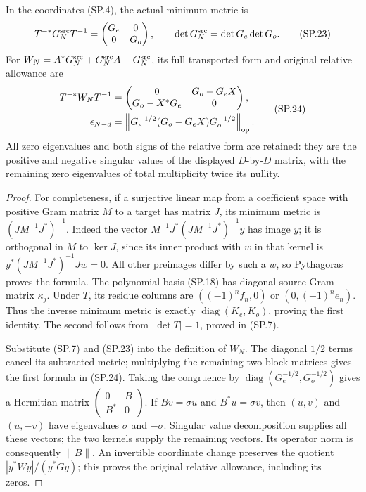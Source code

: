 \begin{theorem}
In the coordinates (SP.4), the actual minimum metric is
\[
 T^{-*}G_N^{\rm src}T^{-1}
       =\begin{pmatrix}G_e&0\\0&G_o\end{pmatrix},\qquad
 \det G_N^{\rm src}=\det G_e\det G_o.
 \tag{SP.23}
\]
For \(W_N=A^*G_N^{\rm src}+G_N^{\rm src}A-G_N^{\rm src}\),
its full transported form and original relative allowance are
\[
 \begin{aligned}
 T^{-*}W_NT^{-1}
   &=\begin{pmatrix}0&G_o-G_eX\\G_o-X^*G_e&0\end{pmatrix},\\
 \epsilon_{N-d}
   &=\left\|G_e^{-1/2}(G_o-G_eX)G_o^{-1/2}\right\|_{\rm op}.
 \end{aligned}
 \tag{SP.24}
\]
All zero eigenvalues and both signs of the relative form are
retained: they are the positive and negative singular values of
the displayed \(D\)-by-\(D\) matrix, with the remaining zero
eigenvalues of total multiplicity twice its nullity.
\end{theorem}

\begin{proof}
For completeness, if a surjective linear map from a coefficient
space with positive Gram matrix \(M\) to a target has matrix \(J\),
its minimum metric is \((JM^{-1}J^*)^{-1}\). Indeed the vector
\(M^{-1}J^*(JM^{-1}J^*)^{-1}y\) has image \(y\); it is orthogonal
in \(M\) to \(\ker J\), since its inner product with \(w\) in that
kernel is \(y^*(JM^{-1}J^*)^{-1}Jw=0\). All other preimages differ
by such a \(w\), so Pythagoras proves the formula. The polynomial
basis (SP.18) has diagonal source Gram matrix \(\kappa_j\).
Under \(T\), its residue columns are \(((-1)^nf_n,0)\) or
\((0,(-1)^ne_n)\). Thus the inverse minimum metric is exactly
\(\operatorname{diag}(K_e,K_o)\), proving the first identity.
The second follows from \(|\det T|=1\), proved in (SP.7).

Substitute (SP.7) and (SP.23) into the definition of \(W_N\).
The diagonal \(1/2\) terms cancel its subtracted metric; multiplying
the remaining two block matrices gives the first formula in
(SP.24). Taking the congruence by \(\operatorname{diag}(G_e^{-1/2},
G_o^{-1/2})\) gives a Hermitian matrix \(\left(\begin{smallmatrix}
0&B\\B^*&0\end{smallmatrix}\right)\). If \(Bv=\sigma u\) and
\(B^*u=\sigma v\), then \((u,v)\) and \((u,-v)\) have eigenvalues
\(\sigma\) and \(-\sigma\). Singular value decomposition supplies
all these vectors; the two kernels supply the remaining vectors.
Its operator norm is consequently \(\|B\|\). An invertible
coordinate change preserves the quotient \(|y^*Wy|/(y^*Gy)\);
this proves the original relative allowance, including its zeros.
\end{proof}

